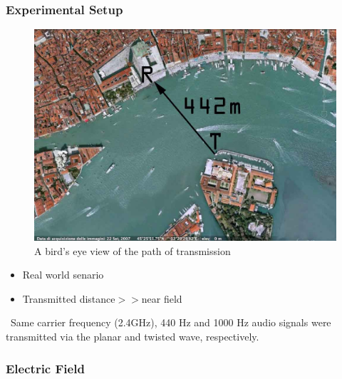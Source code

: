 \documentclass[xcolor=dvipsnames]{beamer}
\newenvironment{items}[1][]
{\begin{itemize}
    \ifthenelse{\isempty{#1}}
    {\setlength{\itemsep}{12pt}}{\setlength{\itemsep}{#1}}}
  {\end{itemize}}
\begin{document}
\begin{frame}
	\frametitle{Experimental Setup}
	\begin{minipage}{0.49\textwidth}
		\begin{figure}
		\includegraphics[width=\textwidth]{birdeyeview}
		\caption{A bird's eye view of the path of transmission}
		\label{pic:birdeye}
		\end{figure}
	\end{minipage}
	\begin{minipage}{0.49\textwidth}
		\begin{items}
		\item Real world senario
		\item Transmitted distance$>>$near field
		\end{items}
	\end{minipage}
\end{frame}
\begin{frame}
\
Same carrier frequency (2.4GHz), 440 Hz and 1000 Hz audio signals were transmitted via the planar and twisted wave, respectively.
\end{frame}





\begin{frame}
  \frametitle{Electric Field}
  \begin{columns}[T,totalwidth=\textwidth]
    \begin{figure}[h]
      \centering
    \end{figure}



  \end{columns}
\end{frame}
\end{document}
